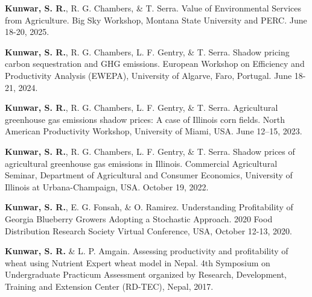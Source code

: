 \textbf{Kunwar, S. R.}, R. G. Chambers, \& T. Serra. Value of Environmental Services from Agriculture. Big Sky Workshop, Montana State University and PERC. June 18-20, 2025.

\textbf{Kunwar, S. R.}, R. G. Chambers, L. F. Gentry, \& T. Serra. Shadow pricing carbon sequestration and GHG emissions. European Workshop on Efficiency and Productivity Analysis (EWEPA), University of Algarve, Faro, Portugal. June 18-21, 2024.

\textbf{Kunwar, S. R.}, R. G. Chambers, L. F. Gentry, \& T. Serra. Agricultural greenhouse gas emissions shadow prices: A case of Illinois corn fields. North American Productivity Workshop, University of Miami, USA. June 12--15, 2023.
    
\textbf{Kunwar, S. R.}, R. G. Chambers, L. F. Gentry, \& T. Serra. Shadow prices of agricultural greenhouse gas emissions in Illinois. Commercial Agricultural Seminar, Department of Agricultural and Consumer Economics, University of Illinois at Urbana-Champaign, USA. October 19, 2022.

\textbf{Kunwar, S. R.}, E. G. Fonsah, \& O. Ramirez. Understanding Profitability of Georgia Blueberry Growers Adopting a Stochastic Approach. 2020 Food Distribution Research Society Virtual Conference, USA,  October 12-13, 2020.

\textbf{Kunwar, S. R.} \& L. P. Amgain. Assessing productivity and profitability of wheat using Nutrient Expert wheat model in Nepal. 4th Symposium on Undergraduate Practicum Assessment organized by Research, Development, Training and Extension Center (RD-TEC), Nepal, 2017.